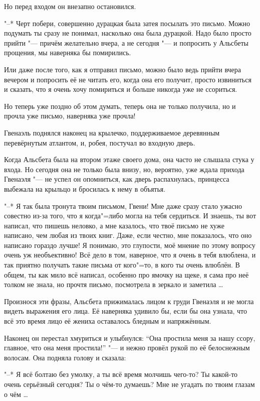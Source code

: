 Но перед входом он внезапно остановился.

"--* Черт побери, совершенно дурацкая была затея посылать это письмо.
Можно подумать ты сразу не понимал, насколько она была дурацкой.
Надо было просто прийти "--- причём желательно вчера, а не сегодня "--- и
попросить у Альсбеты прощения, мы наверняка бы помирились.

Или даже после того, как я отправил письмо, можно было ведь прийти вчера вечером
и попросить её не читать его, когда она его получит, просто извиниться и
сказать, что я очень хочу помириться и больше никогда уже не ссориться.

Но теперь уже поздно об этом думать, теперь она не только получила, но и прочла
уже письмо, наверняка уже прочла!

Гвенаэль поднялся наконец на крылечко, поддерживаемое деревянным перевёрнутым
атлантом, и, робея, постучал во входную дверь.

Когда Альсбета была на втором этаже своего дома, она часто не слышала стука у
входа.
Но сегодня она не только была внизу, но, вероятно, уже ждала прихода Гвенаэля
"--- не успел он опомниться, как дверь распахнулась, принцесса выбежала на
крыльцо и бросилась к нему в объятья.

"--* Я так была тронута твоим письмом, Гвени!
Мне даже сразу стало ужасно совестно из-за того, что я когда"=либо могла на тебя
сердиться.
И знаешь, ты вот написал, что пишешь неловко, а мне казалось, что твоё письмо не
хуже написано, чем любая из твоих книг.
Даже, если честно, мне показалось, что оно написано гораздо лучше!
Я понимаю, это глупости, моё мнение по этому вопросу очень уж необъективно!
Всё дело в том, наверное, что я очень в тебя влюблена, и так приятно получать
такие письма от кого"=то, в кого ты очень влюблён.
В общем, ты как мило всё написал, особенно про ямочку на щеке, я сама про неё
толком не знала, но прочтя письмо, посмотрела в зеркало и заметила \ldots

Произнося эти фразы, Альсбета прижималась лицом к груди Гвенаэля и не могла
видеть выражения его лица.
Её наверняка удивило бы, если бы она узнала, что всё это время лицо её жениха
оставалось бледным и напряжённым.

Наконец он перестал хмуриться и улыбнулся: \enquote{Она простила меня за нашу
ссору, главное, что она меня простила!} "--- и нежно провёл рукой по её
белоснежным волосам.
Она подняла голову и сказала:

"--* Я всё болтаю без умолку, а ты всё время молчишь чего-то?
Ты какой-то очень серьёзный сегодня?
Ты о чём-то думаешь?
Мне не угадать по твоим глазам о чём \ldots

